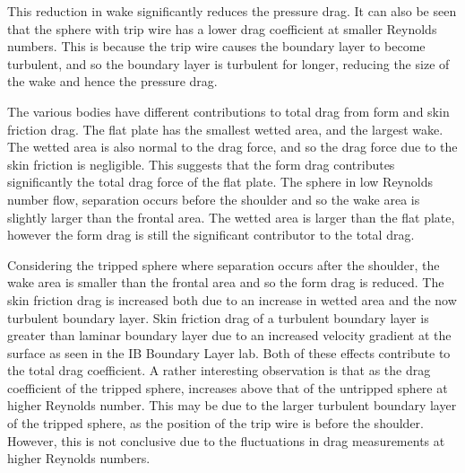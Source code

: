 \documentclass[8pt]{article}
\begin{document}
This reduction in wake significantly reduces the pressure drag.
It can also be seen that the sphere with trip wire has a lower drag coefficient at smaller Reynolds numbers.
This is because the trip wire causes the boundary layer to become turbulent, and so the boundary layer is turbulent for longer, reducing the size of the wake and hence the pressure drag.




The various bodies have different contributions to total drag from form and skin friction drag.
The flat plate has the smallest wetted area, and the largest wake. The wetted area is also normal to the drag force, and so the drag force due to the skin friction is negligible.
This suggests that the form drag contributes significantly the total drag force of the flat plate.
The sphere in low Reynolds number flow, separation occurs before the shoulder and so the wake area is slightly larger than the frontal area.
The wetted area is larger than the flat plate, however the form drag is still the significant contributor to the total drag.

Considering the tripped sphere where separation occurs after the shoulder, the wake area is smaller than the frontal area and so the form drag is reduced.
The skin friction drag is increased both due to an increase in wetted area and the now turbulent boundary layer.
Skin friction drag of a turbulent boundary layer is greater than laminar boundary layer due to an increased velocity gradient at the surface as seen in the IB Boundary Layer lab.
Both of these effects contribute to the total drag coefficient.
A rather interesting observation is that as the drag coefficient of the tripped sphere, increases above that of the untripped sphere at higher Reynolds number.
This may be due to the larger turbulent boundary layer of the tripped sphere, as the position of the trip wire is before the shoulder.
However, this is not conclusive due to the fluctuations in drag measurements at higher Reynolds numbers.
\end{document}

